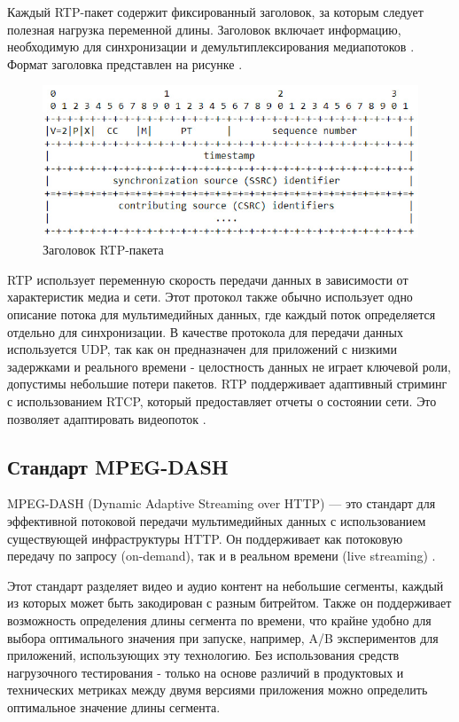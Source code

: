 	Каждый RTP-пакет содержит фиксированный заголовок, за которым следует полезная нагрузка переменной длины. Заголовок включает информацию, необходимую для синхронизации и демультиплексирования медиапотоков \cite{rfcRtp}. Формат заголовка представлен на рисунке \cite{rfcRtp}.

	\begin{figure}[ht!] 
		\center
		\includegraphics [scale=0.8] {my_folder/images//rtp_headers}
		\caption{Заголовок RTP-пакета \cite{rfcRtp}}
		\label{fig:rtp_headers}  
	\end{figure}

	RTP использует переменную скорость передачи данных в зависимости от характеристик медиа и сети. Этот протокол также обычно использует одно описание потока для мультимедийных данных, где каждый поток определяется отдельно для синхронизации. В качестве протокола для передачи данных используется UDP, так как он предназначен для приложений с низкими задержками и реального времени - целостность данных не играет ключевой роли, допустимы небольшие потери пакетов. RTP поддерживает адаптивный стриминг с использованием RTCP, который предоставляет отчеты о состоянии сети. Это позволяет адаптировать видеопоток \cite{rfcRtp}.

\subsection{Стандарт MPEG-DASH}

	MPEG-DASH (Dynamic Adaptive Streaming over HTTP) — это стандарт для эффективной потоковой передачи мультимедийных данных с использованием существующей инфраструктуры HTTP. Он поддерживает как потоковую передачу по запросу (on-demand), так и в реальном времени (live streaming) \cite{mpegDashSite}.

	Этот стандарт разделяет видео и аудио контент на небольшие сегменты, каждый из которых может быть закодирован с разным битрейтом. Также он поддерживает возможность определения длины сегмента по времени, что крайне удобно для выбора оптимального значения при запуске, например, A/B экспериментов для приложений, использующих эту технологию. Без использования средств нагрузочного тестирования - только на основе различий в продуктовых и технических метриках между двумя версиями приложения можно определить оптимальное значение длины сегмента.


